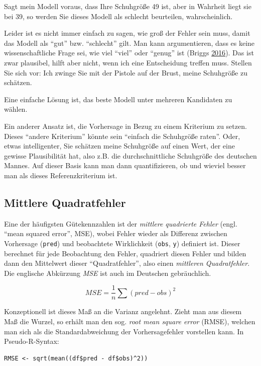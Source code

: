 \documentclass[12pt,ngerman,]{book}
\begin{document}
Sagt mein Modell voraus, dass Ihre Schuhgröße 49 ist, aber in Wahrheit
liegt sie bei 39, so werden Sie dieses Modell als schlecht beurteilen,
wahrscheinlich.

Leider ist es nicht immer einfach zu sagen, wie groß der Fehler sein
muss, damit das Modell als ``gut'' bzw. ``schlecht'' gilt. Man kann
argumentieren, dass es keine wissenschaftliche Frage sei, wie viel
``viel'' oder ``genug'' ist (Briggs
\protect\hyperlink{ref-uncertainty}{2016}). Das ist zwar plausibel,
hilft aber nicht, wenn ich eine Entscheidung treffen muss. Stellen Sie
sich vor: Ich zwinge Sie mit der Pistole auf der Brust, meine Schuhgröße
zu schätzen.

Eine einfache Lösung ist, das beste Modell unter mehreren Kandidaten zu
wählen.

Ein anderer Ansatz ist, die Vorhersage in Bezug zu einem Kriterium zu
setzen. Dieses ``andere Kriterium'' könnte sein ``einfach die Schuhgröße
raten''. Oder, etwas intelligenter, Sie schätzen meine Schuhgröße auf
einen Wert, der eine gewisse Plausibilität hat, also z.B. die
durchschnittliche Schuhgröße des deutschen Mannes. Auf dieser Basis kann
man dann quantifizieren, ob und wieviel besser man als dieses
Referenzkriterium ist.

\subsection{Mittlere Quadratfehler}\label{mittlere-quadratfehler}

Eine der häufigsten Gütekennzahlen ist der \emph{mittlere quadrierte
Fehler} (engl. ``mean squared error'', MSE), wobei Fehler wieder als
Differenz zwischen Vorhersage (\texttt{pred}) und beobachtete
Wirklichkeit (\texttt{obs}, \texttt{y}) definiert ist. Dieser berechnet
für jede Beobachtung den Fehler, quadriert diesen Fehler und bilden dann
den Mittelwert dieser ``Quadratfehler'', also einen \emph{mittleren
Quadratfehler}. Die englische Abkürzung \emph{MSE} ist auch im Deutschen
gebräuchlich.

\[ MSE = \frac{1}{n} \sum{(pred - obs)^2} \]

Konzeptionell ist dieses Maß an die Varianz angelehnt. Zieht man aus
diesem Maß die Wurzel, so erhält man den sog. \emph{root mean square
error} (RMSE), welchen man sich als die Standardabweichung der
Vorhersagefehler vorstellen kann. In Pseudo-R-Syntax:

\begin{verbatim}
RMSE <- sqrt(mean((df$pred - df$obs)^2))
\end{verbatim}
\end{document}

